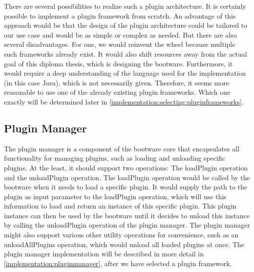 There are several possibilities to realize such a plugin architecture.
It is certainly possible to implement a plugin framework from scratch.
An advantage of this approach would be that the design of the plugin architecture could be tailored to our use case and would be as simple or complex as needed.
But there are also several disadvantages.
For one, we would reinvent the wheel because multiple such frameworks already exist.
It would also shift resources away from the actual goal of this diploma thesis, which is designing the bootware.
Furthermore, it would require a deep understanding of the language used for the implementation (in this case Java), which is not necessarily given.
Therefore, it seems more reasonable to use one of the already existing plugin frameworks.
Which one exactly will be determined later in \autoref{implementation:selecting:pluginframeworks}.

\subsection{Plugin Manager}
\label{design:pluginmanager}

The plugin manager is a component of the bootware core that encapsulates all functionality for managing plugins, such as loading and unloading specific plugins.
At the least, it should support two operations: The loadPlugin operation and the unloadPlugin operation.
The loadPlugin operation would be called by the bootware when it needs to load a specific plugin.
It would supply the path to the plugin as input parameter to the loadPlugin operation, which will use this information to load and return an instance of this specific plugin.
This plugin instance can then be used by the bootware until it decides to unload this instance by calling the unloadPlugin operation of the plugin manager.
The plugin manager might also support various other utility operations for convenience, such as an unloadAllPlugins operation, which would unload all loaded plugins at once.
The plugin manager implementation will be described in more detail in \autoref{implementation:pluginmanager}, after we have selected a plugin framework.

